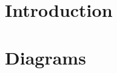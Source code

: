 \documentclass[11pt,a5paper,footinclude=true,headinclude=true]{report} %
\begin{document}

	\tableofcontents 
	
\part{Introduction}
  
\part{Diagrams}
%
\end{document}
